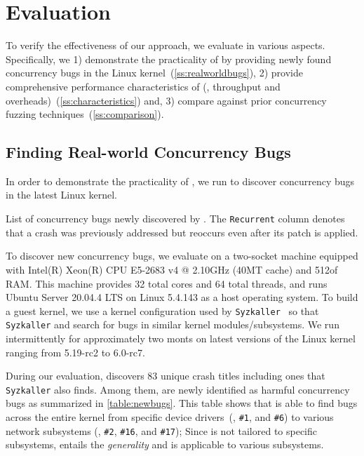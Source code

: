 \section{Evaluation}
\label{s:eval}

To verify the effectiveness of our approach, we evaluate \sys in
various aspects.
%
Specifically, we 1) demonstrate the practicality of \sys by providing
newly found concurrency bugs in the Linux
kernel~(\autoref{ss:realworldbugs}),
%
2) provide comprehensive performance characteristics of \sys (\eg,
throughput and overheads)~(\autoref{ss:characteristics}) and,
%
3) compare \sys against prior concurrency fuzzing
techniques~(\autoref{ss:comparison}).

\subsection{Finding Real-world Concurrency Bugs}
\label{ss:realworldbugs}

In order to demonstrate the practicality of \sys, we run \sys to
discover concurrency bugs in the latest Linux kernel.

\begin{table*}[t]
  
  \centering
  \caption{List of concurrency bugs newly discovered by \sys. The
    \texttt{Recurrent} column denotes that a crash was previously
    addressed but reoccurs even after its patch is applied.}
  \label{table:newbugs}
\end{table*}

%
To discover new concurrency bugs, we evaluate \sys on a two-socket
machine equipped with Intel(R) Xeon(R) CPU E5-2683 v4 @ 2.10GHz (40MT
cache) and 512\GB of RAM.
%
This machine provides 32 total cores and 64 total threads, and runs
Ubuntu Server 20.04.4 LTS on Linux 5.4.143 as a host operating system.
%
To build a guest kernel, we use a kernel configuration used by
\texttt{Syzkaller}~\cite{syzkaller} so that \texttt{Syzkaller} and
\sys search for bugs in similar kernel modules/subsystems.
%
We run intermittently \sys for approximately two monts on latest
versions of the Linux kernel ranging from 5.19-rc2 to 6.0-rc7.


%
During our evaluation, \sys discovers 83 unique crash titles including
ones that \texttt{Syzkaller} also finds. Among them, \totalbugs are
newly identified as harmful concurrency bugs as summarized in
\autoref{table:newbugs}.
%
This table shows that \sys is able to find bugs across the entire
kernel from specific device drivers~(\eg, \texttt{\#1}, and
\texttt{\#6}) to various network subsystems (\eg, \texttt{\#2},
\texttt{\#16}, and \texttt{\#17}); Since \sys is not tailored to
specific subsystems, \sys entails the \textit{generality} and is
applicable to various subsystems.

